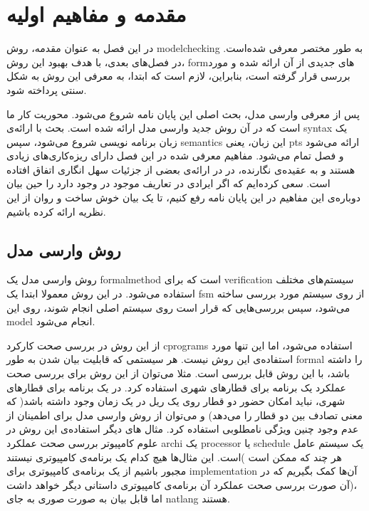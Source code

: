 \pagestyle{plain}
\setcounter{page}{1}

\chapter{مقدمه و مفاهیم اولیه}

در این فصل به عنوان مقدمه، روش \gls*{modelchecking} به‌ طور مختصر معرفی شده‌است. در فصل‌های بعدی، با هدف بهبود این روش، \gls*{form}‌های جدیدی از آن ارائه شده و مورد بررسی قرار گرفته است، بنابراین، لازم است که ابتدا، به معرفی این روش به شکل سنتی پرداخته شود.

پس از معرفی وارسی مدل، بحث اصلی این پایان نامه شروع می‌شود. محوریت کار ما\cite{calcul} است که در آن روش جدید وارسی مدل ارائه شده است. بحث با ارائه‌ی \gls*{syntax} یک زبان برنامه نویسی شروع می‌شود، سپس \gls*{semantics} این زبان، یعنی \gls{pts} ارائه می‌شود و فصل تمام می‌شود. مفاهیم معرفی شده در این فصل دارای ریزه‌کاری‌های زیادی هستند و به عقیده‌ی نگارنده، در \cite{calcul} در ارائه‌ی بعضی از جزئیات سهل انگاری اتفاق افتاده است. سعی کرده‌ایم که اگر ایرادی در تعاریف موجود در \cite{calcul} وجود دارد را حین بیان دوباره‌ی این مفاهیم در این پایان نامه رفع کنیم، تا یک بیان خوش ساخت و روان از این نظریه ارائه کرده باشیم.


\section{روش وارسی مدل}

روش وارسی مدل یک \gls*{formalmethod} است که برای \gls*{verification} سیستم‌های مختلف استفاده می‌شود. در این روش معمولا ابتدا یک \gls*{fsm} از روی سیستم مورد بررسی ساخته می‌شود، سپس بررسی‌هایی که قرار است روی سیستم اصلی انجام شوند، روی این \gls*{model} انجام می‌شود. 

از این روش در بررسی صحت کارکرد \glspl*{cprogram} استفاده می‌شود، اما این تنها مورد استفاده‌ی این روش نیست. هر سیستمی که قابلیت بیان شدن به طور \gls*{formal} را داشته باشد، با این روش قابل بررسی است. مثلا می‌توان از این روش برای بررسی صحت عملکرد یک برنامه برای قطارهای شهری استفاده کرد. در یک برنامه‌ برای قطارهای شهری، نباید امکان حضور دو قطار روی یک ریل در یک زمان وجود داشته باشد( که معنی تصادف بین دو قطار را می‌دهد) و می‌توان از روش وارسی مدل برای اطمینان از عدم وجود چنین ویژگی نامطلوبی استفاده کرد. مثال های دیگر استفاده‌ی این روش در علوم کامپیوتر بررسی صحت عملکرد \gls*{archi} یک \gls*{processor} یا \gls*{schedule} یک سیستم عامل است. این مثال‌ها هیچ کدام یک برنامه‌ی کامپیوتری نیستند( هر چند که ممکن است مجبور باشیم از یک برنامه‌ی کامپیوتری برای \gls*{implementation} آن‌ها کمک بگیریم که در آن صورت بررسی صحت عملکرد آن برنامه‌ی کامپیوتری داستانی دیگر خواهد داشت)، اما قابل بیان به صورت صوری به جای \gls*{natlang} هستند.

